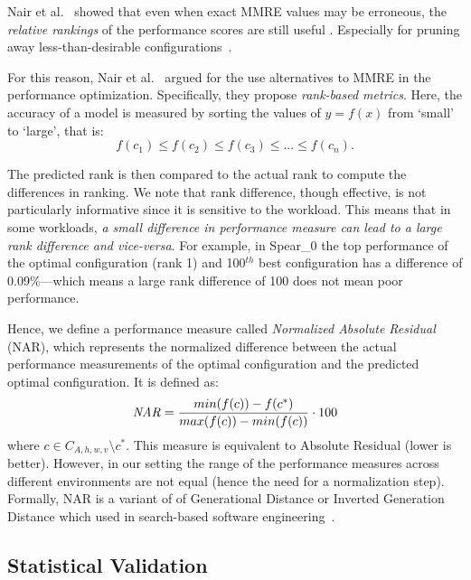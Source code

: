 \documentclass[10pt,journal,compsoc]{IEEEtran}
\begin{document}
Nair et al.~\cite{nair2017using} showed that even when exact MMRE values may be erroneous, the {\em relative rankings} of the  performance scores are still useful . Especially for pruning away less-than-desirable
configurations~\cite{nair2017using}.    


For this reason, Nair et al.~\cite{nair2017using} argued for the use alternatives to MMRE in the performance optimization. Specifically, they propose \textit{rank-based metrics}. Here, the accuracy of a model is measured  by sorting the values of $y=f(x)$ from `small' to `large', that is:
\begin{equation}
    f(c_1) \le f(c_2) \le f(c_3) \le ... \le f(c_n).
\end{equation}

\noindent The predicted rank is then compared to the actual rank to compute the differences in ranking. We note that rank difference, though effective, is not particularly informative since it is sensitive to the workload. This means that in some workloads, \textit{a small difference in performance measure can lead to a large rank difference and vice-versa}. For example, in {\sc Spear\_0} the top performance of the optimal configuration (rank 1) and 100$^{th}$ best configuration has a difference of 0.09\%---which means a large rank difference of 100 does not mean poor performance. 

Hence, we define a performance measure called \textit{Normalized Absolute Residual} (NAR), which represents the normalized difference between the actual performance measurements of the optimal configuration and the predicted optimal configuration. It is defined as: 
\begin{equation}
\label{eq:nar}
{ \tiny
    \mathit{NAR} = \frac{min(f(c)) - f(c^{*})}{max(f(c)) - min(f(c))} \cdot 100
}
\end{equation}
where $c \in C_{A,h,w,v} \setminus c^*$. This measure is equivalent to Absolute Residual (lower is better). However, in our setting the range of the performance measures across different environments are not equal (hence the need for a normalization step). Formally, NAR is a variant of of Generational Distance or Inverted Generation Distance which used in search-based software engineering~\cite{wang2016practical, chen2018sampling, deb2002fast}.

\subsection{Statistical Validation}
\label{sect:stats}
\end{document}
